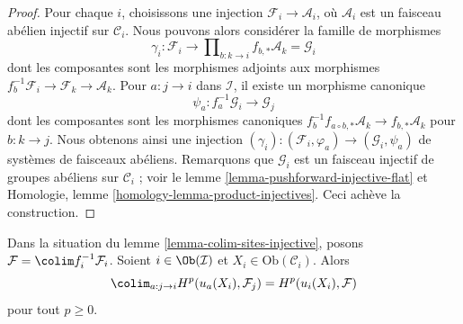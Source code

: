 \begin{proof}
Pour chaque $i$, choisissons une injection $\mathcal{F}_i \to \mathcal{A}_i$,
où $\mathcal{A}_i$ est un faisceau abélien injectif sur $\mathcal{C}_i$.
Nous pouvons alors considérer la famille de morphismes
$$
\gamma_i :
\mathcal{F}_i
\longrightarrow
\prod\nolimits_{b : k \to i} f_{b, *}\mathcal{A}_k = \mathcal{G}_i
$$
dont les composantes sont les morphismes adjoints aux morphismes
$f_b^{-1}\mathcal{F}_i \to \mathcal{F}_k \to \mathcal{A}_k$.
Pour $a : j \to i$ dans $\mathcal{I}$, il existe un morphisme canonique
$$
\psi_a : f_a^{-1}\mathcal{G}_i \to \mathcal{G}_j
$$
dont les composantes sont les morphismes canoniques
$f_b^{-1}f_{a \circ b, *}\mathcal{A}_k \to f_{b, *}\mathcal{A}_k$
pour $b : k \to j$. Nous obtenons ainsi une injection
$(\gamma_i) : (\mathcal{F}_i, \varphi_a) \to (\mathcal{G}_i, \psi_a)$
de systèmes de faisceaux abéliens. Remarquons que $\mathcal{G}_i$ est un
faisceau injectif de groupes abéliens sur $\mathcal{C}_i$ ; voir le
lemme \ref{lemma-pushforward-injective-flat} et Homologie,
lemme \ref{homology-lemma-product-injectives}.
Ceci achève la construction.
\end{proof}

\begin{lemma}
\label{lemma-colimit}
Dans la situation du lemme \ref{lemma-colim-sites-injective}, posons
$\mathcal{F} = \colim f_i^{-1}\mathcal{F}_i$.
Soient $i \in \Ob(\mathcal{I})$ et $X_i \in \text{Ob}(\mathcal{C}_i)$. Alors
$$
\colim_{a : j \to i} H^p(u_a(X_i), \mathcal{F}_j) =
H^p(u_i(X_i), \mathcal{F})
$$
pour tout $p \geq 0$.
\end{lemma}

